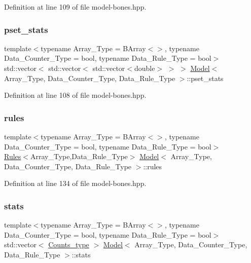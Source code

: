 Definition at line 109 of file model-\/bones.\+hpp.

\mbox{\label{class_model_a89fff457ecccc91a624e20cafbf3e765}} 
\subsubsection{\texorpdfstring{pset\+\_\+stats}{pset\_stats}}
{\footnotesize\ttfamily template$<$typename Array\+\_\+\+Type  = B\+Array$<$$>$, typename Data\+\_\+\+Counter\+\_\+\+Type  = bool, typename Data\+\_\+\+Rule\+\_\+\+Type  = bool$>$ \\
std\+::vector$<$ std\+::vector$<$ std\+::vector$<$double$>$ $>$ $>$ \hyperlink{class_model}{Model}$<$ Array\+\_\+\+Type, Data\+\_\+\+Counter\+\_\+\+Type, Data\+\_\+\+Rule\+\_\+\+Type $>$\+::pset\+\_\+stats}



Definition at line 108 of file model-\/bones.\+hpp.

\mbox{\label{class_model_a65b96a73f8dba8a00cc767753aaca22b}} 
\subsubsection{\texorpdfstring{rules}{rules}}
{\footnotesize\ttfamily template$<$typename Array\+\_\+\+Type  = B\+Array$<$$>$, typename Data\+\_\+\+Counter\+\_\+\+Type  = bool, typename Data\+\_\+\+Rule\+\_\+\+Type  = bool$>$ \\
\hyperlink{class_rules}{Rules}$<$Array\+\_\+\+Type,Data\+\_\+\+Rule\+\_\+\+Type$>$ \hyperlink{class_model}{Model}$<$ Array\+\_\+\+Type, Data\+\_\+\+Counter\+\_\+\+Type, Data\+\_\+\+Rule\+\_\+\+Type $>$\+::rules}



Definition at line 134 of file model-\/bones.\+hpp.

\mbox{\label{class_model_abd7e36250a681bd2ade69d087e8200e1}} 
\subsubsection{\texorpdfstring{stats}{stats}}
{\footnotesize\ttfamily template$<$typename Array\+\_\+\+Type  = B\+Array$<$$>$, typename Data\+\_\+\+Counter\+\_\+\+Type  = bool, typename Data\+\_\+\+Rule\+\_\+\+Type  = bool$>$ \\
std\+::vector$<$ \hyperlink{typedefs_8hpp_aee40fa17c1fddb63dd1f2b1470ade95b}{Counts\+\_\+type} $>$ \hyperlink{class_model}{Model}$<$ Array\+\_\+\+Type, Data\+\_\+\+Counter\+\_\+\+Type, Data\+\_\+\+Rule\+\_\+\+Type $>$\+::stats}



